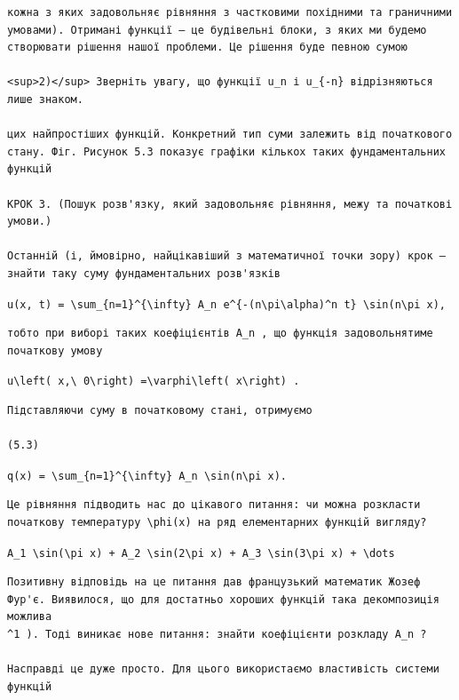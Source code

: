 \documentclass[
  ukrainian,
]{article}
\begin{document}
\begin{verbatim}
кожна з яких задовольняє рівняння з частковими похідними та граничними умовами). Отримані функції — це будівельні блоки, з яких ми будемо створювати рішення нашої проблеми. Це рішення буде певною сумою

<sup>2)</sup> Зверніть увагу, що функції u_n і u_{-n} відрізняються лише знаком.

цих найпростіших функцій. Конкретний тип суми залежить від початкового стану. Фіг. Рисунок 5.3 показує графіки кількох таких фундаментальних функцій

КРОК 3. (Пошук розв'язку, який задовольняє рівняння, межу та початкові умови.)

Останній (і, ймовірно, найцікавіший з математичної точки зору) крок — знайти таку суму фундаментальних розв'язків
\end{verbatim}

\texttt{u(x,\ t)\ =\ \textbackslash{}sum\_\{n=1\}\^{}\{\textbackslash{}infty\}\ A\_n\ e\^{}\{-(n\textbackslash{}pi\textbackslash{}alpha)\^{}n\ t\}\ \textbackslash{}sin(n\textbackslash{}pi\ x),}

\begin{verbatim}
тобто при виборі таких коефіцієнтів A_n , що функція задовольнятиме початкову умову
\end{verbatim}

\texttt{u\textbackslash{}left(\ x,\textbackslash{}\ 0\textbackslash{}right)\ =\textbackslash{}varphi\textbackslash{}left(\ x\textbackslash{}right)\ .}

\begin{verbatim}
Підставляючи суму в початковому стані, отримуємо

(5.3)
\end{verbatim}

\texttt{q(x)\ =\ \textbackslash{}sum\_\{n=1\}\^{}\{\textbackslash{}infty\}\ A\_n\ \textbackslash{}sin(n\textbackslash{}pi\ x).}

\begin{verbatim}
Це рівняння підводить нас до цікавого питання: чи можна розкласти початкову температуру \phi(x) на ряд елементарних функцій вигляду?
\end{verbatim}

\texttt{A\_1\ \textbackslash{}sin(\textbackslash{}pi\ x)\ +\ A\_2\ \textbackslash{}sin(2\textbackslash{}pi\ x)\ +\ A\_3\ \textbackslash{}sin(3\textbackslash{}pi\ x)\ +\ \textbackslash{}dots}

\begin{verbatim}
Позитивну відповідь на це питання дав французький математик Жозеф Фур'є. Виявилося, що для достатньо хороших функцій така декомпозиція можлива 
^1 ). Тоді виникає нове питання: знайти коефіцієнти розкладу A_n ?

Насправді це дуже просто. Для цього використаємо властивість системи функцій
\end{verbatim}
\end{document}
